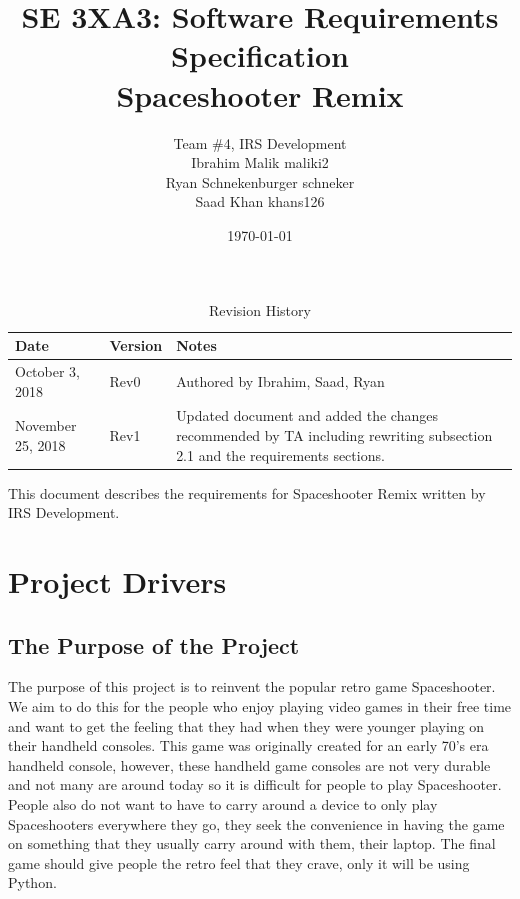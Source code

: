 \documentclass[12pt, titlepage]{article}
\title{SE 3XA3: Software Requirements Specification\\Spaceshooter Remix}
\author{Team \#4, IRS Development
		\\ Ibrahim Malik maliki2
		\\ Ryan Schnekenburger schneker
		\\ Saad Khan khans126
}
\date{\today}
\begin{document}
\maketitle

\tableofcontents
\listoftables
\listoffigures

\newpage

\begin{table}[hp]
\caption{Revision History} \label{TblRevisionHistory}
\begin{tabularx}{\textwidth}{llX}
\toprule {\bf Date} & {\bf Version} & {\bf Notes}\\
\midrule
October 3, 2018 & Rev0 & Authored by Ibrahim, Saad, Ryan\\
November 25, 2018 & Rev1 & Updated document and added the changes recommended by TA including rewriting subsection 2.1 and the requirements sections.\\
\bottomrule
\end{tabularx}
\end{table}

\noindent This document describes the requirements for Spaceshooter Remix written by IRS Development.

\newpage


\section{Project Drivers}

\subsection{The Purpose of the Project}

The purpose of this project is to reinvent the popular retro game Spaceshooter. We aim to do this for the people who enjoy playing video games in their free time and want to get the feeling that they had when they were younger playing on their handheld consoles. This game was originally created for an early 70's era handheld console, however, these handheld game consoles are not very durable and not many are around today so it is difficult for people to play Spaceshooter. People also do not want to have to carry around a device to only play Spaceshooters everywhere they go, they seek the convenience in having the game on something that they usually carry around with them, their laptop. The final game should give people the retro feel that they crave, only it will be using Python.  
\end{document}
